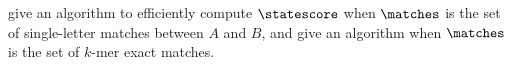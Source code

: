 \citet{hunt1977fast} give an algorithm to efficiently compute $\statescore$ when
$\matches$ is the set of single-letter matches between $A$ and $B$, and
\citet{deorowicz2014efficient} give an algorithm when $\matches$ is the set of
$k$-mer exact matches.


